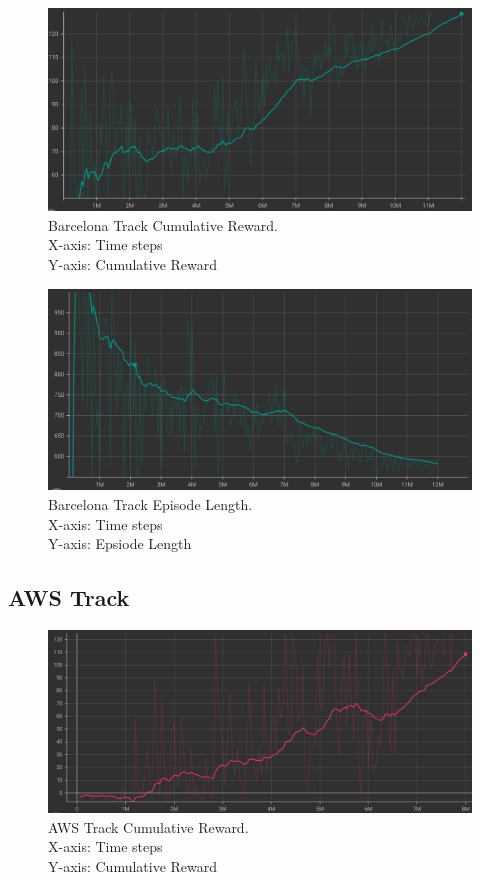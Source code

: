 \begin{figure}[H]
    \centering
    \includegraphics[width=1.0\textwidth]{images/graphs/Barcelona-Reward.png}
    \caption{\centering Barcelona Track Cumulative Reward. \\ X-axis: Time steps \\ Y-axis: Cumulative Reward}
    \label{fig:rl}
\end{figure}

\begin{figure}[H]
    \centering
    \includegraphics[width=1.0\textwidth]{images/graphs/Barcelona-Episode.png}
    \caption{\centering Barcelona Track Episode Length. \\ X-axis: Time steps \\ Y-axis: Epsiode Length}
    \label{fig:rl}
\end{figure}

\subsection{AWS Track}

\begin{figure}[H]
    \centering
    \includegraphics[width=1.0\textwidth]{images/graphs/AWS_baseline.png}
    \caption{\centering AWS Track Cumulative Reward. \\ X-axis: Time steps \\ Y-axis: Cumulative Reward}
    \label{fig:rl}
\end{figure}

